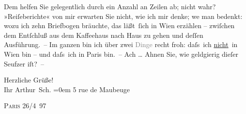                Dem helfen Sie gelegentlich durch ein Anzahl an Zeilen ab; nicht wahr?
               »Reiſeberichte« von mir erwarten Sie nicht, wie ich mir denke; we{\geminationn} man bedenkt: wozu ich zehn Briefbogen bräuchte, das
               läßt ſich in Wien erzählen – zwiſchen dem
               Entſchluß aus dem Kaffeehaus nach Haus zu gehen und deſſen Ausführung. – Im
               ganzen bin ich über zwei \textcolor{gray}{Dinge} recht froh: daſs ich \uline{nicht} in Wien bin –
               und daſs ich in Paris bin. – Ach {\dots} Ahnen
               Sie, wie geldgierig dieſer Seufzer iſt? –\pend
           
\pstart
           Herzliche Grüße!{\\[\baselineskip]} Ihr \spacefill\mbox{Arthur Sch.}\pend
           \leftskip=0em{}
\pstart
           \noindent{}5 rue \introOben{}de\introOben{} Maubeuge\pend
           
\pstart
           \textsc{Paris}{ }26/4 97\pend
           \endnumbering{}
\begin{anhang}
\end{anhang}\newcommand{\dateiname}{L04112}\newcommand{\titel}{Arthur Schnitzler an Gustav Schwarzkopf, 26. 4. 1897}\newcommand{\editorInnen}{Herausgegeben von Jahnke, SelmaMüller, Martin Anton}
